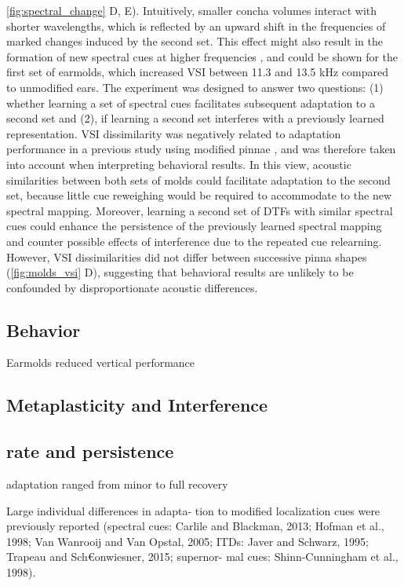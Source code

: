 \cref{fig:spectral_change} D, E). Intuitively, smaller concha volumes interact with shorter wavelengths, which is reflected by an upward shift in the frequencies of marked changes induced by the second set. This effect might also result in the formation of new spectral cues at higher frequencies \citep{wanrooij_relearning_2005}, and could be shown for the first set of earmolds, which increased VSI between 11.3 and 13.5 kHz compared to unmodified ears. The experiment was designed to answer two questions: (1) whether learning a set of spectral cues facilitates subsequent adaptation to a second set and (2), if learning a second set interferes with a previously learned representation. VSI dissimilarity was negatively related to adaptation performance in a previous study using modified pinnae \citep{trapeau_fast_2016}, and was therefore taken into account when interpreting behavioral results. In this view, acoustic similarities between both sets of molds could facilitate adaptation to the second set, because little cue reweighing would be required to accommodate to the new spectral mapping. Moreover, learning a second set of DTFs with similar spectral cues could enhance the persistence of the previously learned spectral mapping and counter possible effects of interference due to the repeated cue relearning. However, VSI dissimilarities did not differ between successive pinna shapes (\cref{fig:molds_vsi} D), suggesting that behavioral results are unlikely to be confounded by disproportionate acoustic differences. 

\subsection{Behavior}

Earmolds reduced vertical performance  

\subsection{Metaplasticity and Interference}
\subsection{rate and persistence }




\newpage

adaptation ranged from minor to full recovery  

Large individual differences in adapta- tion to modified localization cues were previously reported (spectral cues: Carlile and Blackman, 2013; Hofman et al., 1998; Van Wanrooij and Van Opstal, 2005; ITDs: Javer and Schwarz, 1995; Trapeau and Sch€onwiesner, 2015; supernor- mal cues: Shinn-Cunningham et al., 1998).




